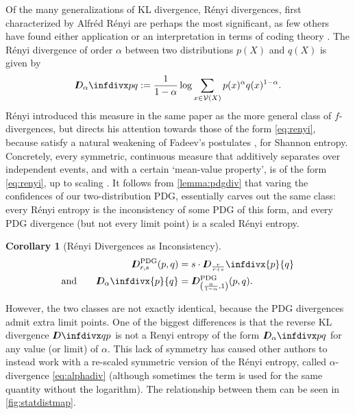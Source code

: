 \documentclass[twoside]{article}
\theoremstyle{plain}
\newtheorem{coro}{Corollary}[theorem]
\theoremstyle{definition}
\newcommand{\thickD}{I\mkern-8muD}
\newcommand{\kldiv}{\thickD\infdivx}
\newcommand{\V}{\mathcal V}
\begin{document}
Of the many generalizations of KL divergence, R\'enyi divergences, first characterized by Alfr\'ed R\'enyi \cite{renyi1961measures} are perhaps the most significant, as few others have found either application or an interpretation in terms of coding theory \cite{van2014renyi}.
The R\'enyi divergence of order $\alpha$ between two distributions $p(X)$ and $q(X)$ is given by
\begin{equation}
	\thickD_\alpha\infdivx p q := \frac{1}{1- \alpha} \log \sum_{x \in \V(X)} p(x)^\alpha q(x)^{1-\alpha}.  \label{eq:renyi}
\end{equation}
R\'enyi introduced this measure in the same paper as the more general class of $f$-divergences, but directs his attention towards those of the form \eqref{eq:renyi}, because satisfy a natural weakening of Fadeev's postulates \cite{fadeev1957begriff}, for Shannon entropy.
Concretely, every symmetric, continuous measure that additively separates over independent events, and with a certain `mean-value property', is of the form \eqref{eq:renyi}, up to scaling \cite{renyi1961measures}.
It follows from \cref{lemma:pdgdiv} that varing the confidences of our two-distribution PDG, essentially carves out the same class: every R\'enyi entropy is the inconsistency of some PDG of this form, and every PDG divergence (but not every limit point) is a scaled R\'enyi entropy.

\begin{coro}[R\'enyi Divergences as Inconsistency]
    \begin{align*}
        \thickD^{\mathrm{PDG}}_{r, s}(p, q) &=
            s \cdot \thickD_{\frac{r}{r+s}}\infdivx{p}{q}
        \\\text{and}\qquad
        \thickD_{\alpha}\infdivx{p}{q}
        &= \thickD^{\mathrm{PDG}}_{\left(\frac{\alpha}{1-\alpha}, 1\right)}(p, q).
    \end{align*}
\end{coro}

However, the two classes are not exactly identical, because the PDG divergences admit extra limit points. One of the biggest differences is that the reverse KL divergence $\kldiv q p$ is not a Renyi entropy of the form $\thickD_\alpha\infdivx p q$ for any value (or limit) of $\alpha$. This lack of symmetry has caused other authors \cite{cichocki2010families} to instead work with a re-scaled symmetric version of the R\'enyi entropy, called $\alpha$-divergence \eqref{eq:alphadiv}  (although sometimes the term is used for the same quantity without the logarithm).  The relationship between them can be seen in \cref{fig:statdistmap}.
\end{document}
